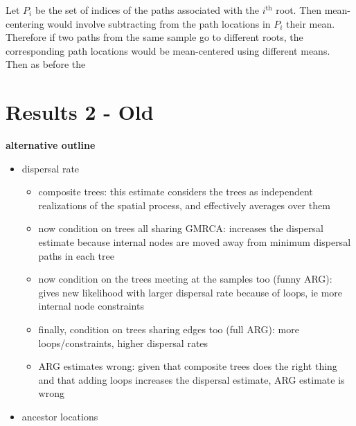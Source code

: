 Let $P_i$ be the set of indices of the paths associated with the $i^\text{th}$ root. Then mean-centering would involve subtracting from the path locations in $P_i$ their mean. Therefore if two paths from the same sample go to different roots, the corresponding path locations would be mean-centered using different means. Then as before the 


\section{Results 2 - Old } 

\textbf{alternative outline}
\begin{itemize}
    \item dispersal rate
    \begin{itemize}
        \item composite trees: this estimate considers the trees as independent realizations of the spatial process, and effectively averages over them
        \item now condition on trees all sharing GMRCA: increases the dispersal estimate because internal nodes are moved away from minimum dispersal paths in each tree
        \item now condition on the trees meeting at the samples too (funny ARG): gives new likelihood with larger dispersal rate because of loops, ie more internal node constraints
        \item finally, condition on trees sharing edges too (full ARG): more loops/constraints, higher dispersal rates
        \item ARG estimates wrong: given that composite trees does the right thing and that adding loops increases the dispersal estimate, ARG estimate is wrong
    \end{itemize}
    \item ancestor locations
\end{itemize}

